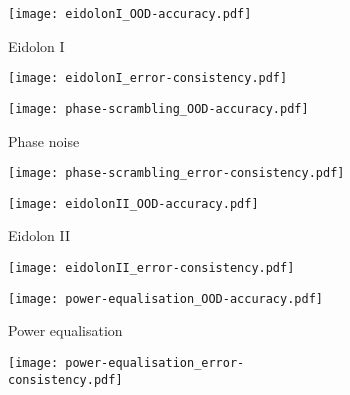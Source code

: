 \begin{figure}
		\begin{subfigure}{\figwidth}
			\centering
			\texttt{[image: eidolonI\_OOD-accuracy.pdf]}
			\vspace{\captionspace}
			\caption{Eidolon I}
			\vspace{\captionspaceII}
		\end{subfigure}\hfill
		\begin{subfigure}{\figwidth}
			\centering        \texttt{[image: eidolonI\_error-consistency.pdf]}
			\vspace{\captionspace}
			\caption*{}
			\vspace{\captionspaceII}
		\end{subfigure}\hfill
		\begin{subfigure}{\figwidth}
			\centering
			\texttt{[image: phase-scrambling\_OOD-accuracy.pdf]}
			\vspace{\captionspace}
			\caption{Phase noise}
			\vspace{\captionspaceII}
		\end{subfigure}\hfill
		\begin{subfigure}{\figwidth}
			\centering
			\texttt{[image: phase-scrambling\_error-consistency.pdf]}
			\vspace{\captionspace}
			\caption*{}
			\vspace{\captionspaceII}
		\end{subfigure}\hfill
		
	\begin{subfigure}{\figwidth}
		\centering
		\texttt{[image: eidolonII\_OOD-accuracy.pdf]}
		\vspace{\captionspace}
		\caption{Eidolon II}
		\vspace{\captionspaceII}
	\end{subfigure}\hfill
	\begin{subfigure}{\figwidth}
		\centering
		\texttt{[image: eidolonII\_error-consistency.pdf]}
		\vspace{\captionspace}
		\caption*{}
		\vspace{\captionspaceII}
	\end{subfigure}\hfill
	\begin{subfigure}{\figwidth}
		\centering
		\texttt{[image: power-equalisation\_OOD-accuracy.pdf]}
		\vspace{\captionspace}
		\caption{Power equalisation}
		\vspace{\captionspaceII}
	\end{subfigure}\hfill
	\begin{subfigure}{\figwidth}
		\centering
		\texttt{[image: power-equalisation\_error-consistency.pdf]}
		\vspace{\captionspace}
		\caption*{}
		\vspace{\captionspaceII}
	\end{subfigure}\hfill
	

\end{figure}
